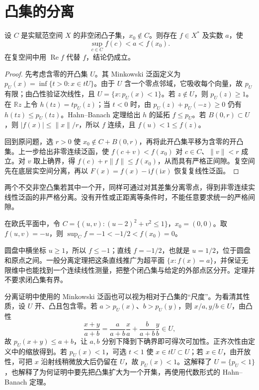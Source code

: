 \section{凸集的分离}
\begin{theorem}[点与闭凸集的严格分离]\label{thm:fa-separation}
设 $C$ 是实赋范空间 $X$ 的非空闭凸子集，$x_0\notin C$。则存在 $f\in X^*$ 及实数 $a$，使
\[
 \sup_{c\in C}f(c)<a<f(x_0).
\]
在复空间中用 $\operatorname{Re}f$ 代替 $f$，结论仍成立。
\end{theorem}
\begin{proof}
先考虑含零的开凸集 $U$。其 Minkowski 泛函定义为 $p_U(x)=\inf\{t>0:x\in tU\}$。由于 $U$ 含一个零点邻域，它吸收每个向量，故 $p_U$ 有限；由凸性验证次线性，且 $U=\{x:p_U(x)<1\}$。若 $z\notin U$，则 $p_U(z)\geq1$。在 $\mathbb Rz$ 上令 $h(tz)=tp_U(z)$；当 $t<0$ 时，由 $p_U(z)+p_U(-z)\geq0$ 仍有 $h(tz)\leq p_U(tz)$。Hahn--Banach 定理给出 $h$ 的延拓 $f\leq p_U$。若 $B(0,r)\subset U$，则 $|f(x)|\leq\|x\|/r$，所以 $f$ 连续，且 $f(u)<1\leq f(z)$。

回到原问题，选 $r>0$ 使 $x_0\notin C+B(0,r)$，再将此开凸集平移为含零的开凸集。上一步给出非零连续泛函，使 $f(c+v)<f(x_0)$ 对 $c\in C$、$\|v\|<r$ 成立。对 $v$ 取上确界，得 $f(c)+r\|f\|\leq f(x_0)$，从而具有严格正间隙。复空间先在底层实空间分离，再以 $F(x)=f(x)-\mathrm if(\mathrm ix)$ 恢复复线性泛函。
\end{proof}
两个不交非空凸集若其中一个开，同样可通过对其差集分离零点，得到非零连续实线性泛函的非严格分离。没有开性或正距离等条件时，不能任意要求统一的严格间隙。

\begin{example}[分离定理的二维图景]
在欧氏平面中，令 $C=\{(u,v):(u-2)^2+v^2\leq1\}$，$x_0=(0,0)$。取 $f(u,v)=-u$，则 $\sup_C f=-1< -1/2<f(x_0)=0$。
\end{example}
\begin{solve}
圆盘中横坐标 $u\geq1$，所以 $f\leq-1$；直线 $f=-1/2$，也就是 $u=1/2$，位于圆盘和原点之间。一般分离定理把这条直线推广为超平面 $\{x:f(x)=a\}$，并保证无限维中也能找到一个连续线性测量，把整个闭凸集与给定的外部点区分开。定理并不要求闭凸集有界。
\end{solve}

分离证明中使用的 Minkowski 泛函也可以视为相对于凸集的“尺度”。为看清其性质，设 $U$ 开、凸且包含零。若 $a>p_U(x)$、$b>p_U(y)$，则 $x/a,y/b\in U$，由凸性
\[
 \frac{x+y}{a+b}=\frac a{a+b}\frac xa+\frac b{a+b}\frac yb\in U,
\]
故 $p_U(x+y)\leq a+b$，让 $a,b$ 分别下降到下确界即可得次可加性。正齐次性由定义中的缩放得到。若 $p_U(x)<1$，可选 $t<1$ 使 $x\in tU\subset U$；若 $x\in U$，由开放性，可把 $x$ 沿射线稍微放大后仍留在 $U$，故 $p_U(x)<1$。这解释了 $U=\{p_U<1\}$，也解释了为何证明中要先把凸集扩大为一个开集，再使用代数形式的 Hahn--Banach 定理。

